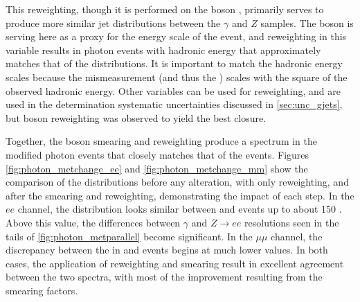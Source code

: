 This reweighting, though it is performed on the boson \pt, primarily serves to produce more similar jet distributions between the $\gamma$ and $Z$ samples. The boson \pt is serving here as a proxy for the energy scale of the event, and reweighting in this variable results in photon events with hadronic energy that approximately matches that of the \dyjets distributions. It is important to match the hadronic energy scales because the mismeasurement (and thus the \met) scales with the square of the observed hadronic energy. Other variables can be used for reweighting, and are used in the determination systematic uncertainties discussed in \autoref{sec:unc_gjets}, but boson \pt reweighting was observed to yield the best closure.


Together, the boson smearing and \pt reweighting produce a \met spectrum in the modified photon events that closely matches that of the \dyjets events. Figures \ref{fig:photon_metchange_ee} and \ref{fig:photon_metchange_mm} show the comparison of the \met distributions before any alteration, with only \pt reweighting, and after the smearing and reweighting, demonstrating the impact of each step. In the $ee$ channel, the \met distribution looks similar between \dyjets and \gjets events up to about 150 \gev. Above this value, the differences between $\gamma$ and $Z\rightarrow ee$ resolutions seen in the tails of \autoref{fig:photon_metparallel} become significant. In the $\mu\mu$ channel, the discrepancy between the \met in \dyjets and \gjets events begins at much lower values. In both cases, the application of \pt reweighting and smearing result in excellent agreement between the two \met spectra, with most of the improvement resulting from the smearing factors. 


